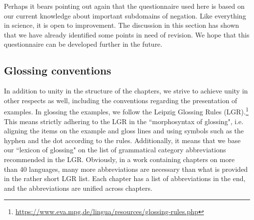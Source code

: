 \documentclass[output=paper,colorlinks,citecolor=brown]{langscibook}
\begin{document}
Perhaps it bears pointing out again that the questionnaire used here is based on our current knowledge about important subdomains of negation. Like everything in science, it is open to improvement. The discussion in this section has shown that we have already identified some points in need of revision. We hope that this questionnaire can be developed further in the future.
%

\subsection{Glossing conventions}\label{subsect:intro:2.3:glossing}

In addition to unity in the structure of the chapters, we strive to achieve unity in other respects as well, including the conventions regarding the presentation of examples. In glossing the examples, we follow the Leipzig Glossing Rules (LGR).\footnote{\href{https://www.eva.mpg.de/lingua/resources/glossing-rules.php}{https://www.eva.mpg.de/lingua/resources/glossing-rules.php}} This means strictly adhering to the LGR in the ``morphosyntax of glossing", i.e. aligning the items on the example and gloss lines and using symbols such as the hyphen and the dot according to the rules. Additionally, it means that we base our ``lexicon of glossing" on the list of grammatical category abbreviations recommended in the LGR. Obviously, in a work containing chapters on more than 40 languages, many more abbreviations are necessary than what is provided in the rather short LGR list. Each chapter has a list of abbreviations in the end, and the abbreviations are unified across chapters. 
\end{document}

